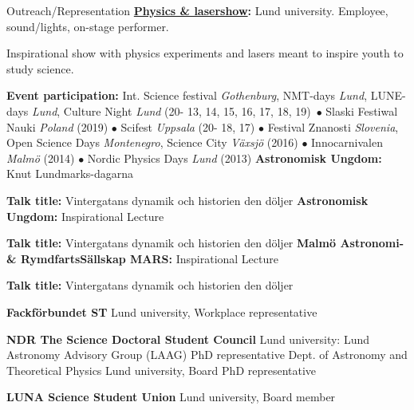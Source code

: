 \begin{rubric}{Outreach/Representation}
\entry*[2013 - ]%
\textbf{\href{https://www.facebook.com/Physicsandlasershow}{Physics \& lasershow}:} Lund university. Employee, sound/lights, on-stage performer. \par Inspirational show with physics experiments and lasers meant to inspire youth to study science. \par
\textbf{Event participation:} Int. Science festival \textit{Gothenburg}, NMT-days \textit{Lund}, LUNE-days \textit{Lund}, Culture Night \textit{Lund} (20- 13, 14, 15, 16, 17, 18, 19)\ $\bullet$ Slaski Festiwal Nauki \textit{Poland} (2019)  $\bullet$ Scifest \textit{Uppsala} (20- 18, 17) $\bullet$ Festival Znanosti \textit{Slovenia}, Open Science Days \textit{Montenegro}, Science City \textit{Växsjö} (2016) $\bullet$ Innocarnivalen \textit{Malmö} (2014) $\bullet$ Nordic Physics Days \textit{Lund} (2013)
\entry*[2021]
%
\textbf{Astronomisk Ungdom:} Knut Lundmarks-dagarna \par 
\textbf{Talk title:} Vintergatans dynamik och historien den döljer
\entry*[2020]
%
\textbf{Astronomisk Ungdom:} Inspirational Lecture \par 
\textbf{Talk title:} Vintergatans dynamik och historien den döljer
\entry*[2020]
%
\textbf{Malmö Astronomi- \& RymdfartsSällskap MARS:} Inspirational Lecture \par 
\textbf{Talk title:} Vintergatans dynamik och historien den döljer

\entry*[2021 -]%
\textbf{Fackförbundet ST} Lund university, Workplace representative\par

%
\entry*[]
\textbf{NDR The Science Doctoral Student Council} Lund university:
\entry*[\prefix{}2020 -] Lund Astronomy Advisory Group (LAAG) PhD representative
\entry*[2017-2018] Dept. of Astronomy and Theoretical Physics Lund university, Board PhD representative\par
{}%
\textbf{LUNA Science Student Union} Lund university, Board member \par

\end{rubric}
